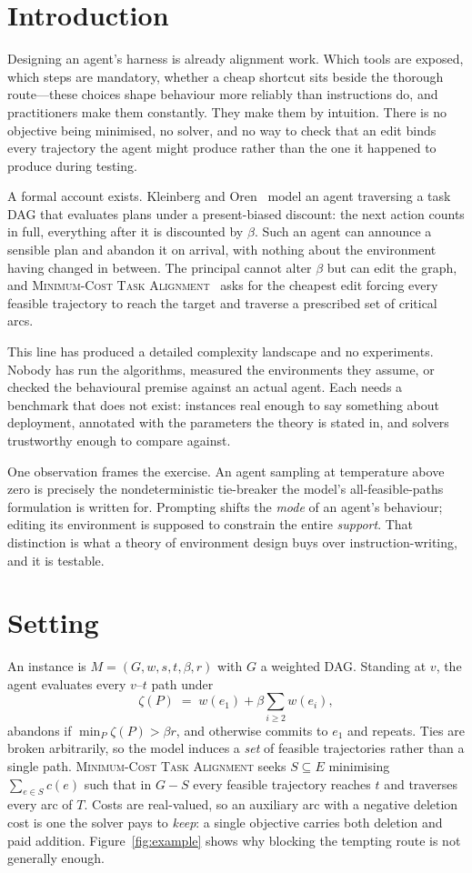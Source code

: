 \documentclass[10pt]{article}
\newcommand{\MCTA}{\textsc{Minimum-Cost Task Alignment}}
\begin{document}
\section{Introduction}

Designing an agent's harness is already alignment work. Which tools are exposed,
which steps are mandatory, whether a cheap shortcut sits beside the thorough
route---these choices shape behaviour more reliably than instructions do, and
practitioners make them constantly. They make them by intuition. There is no
objective being minimised, no solver, and no way to check that an edit binds every
trajectory the agent might produce rather than the one it happened to produce
during testing.

A formal account exists. Kleinberg and Oren~\cite{kleinberg2014} model an agent
traversing a task DAG that evaluates plans under a present-biased discount: the
next action counts in full, everything after it is discounted by $\beta$. Such an
agent can announce a sensible plan and abandon it on arrival, with nothing about
the environment having changed in between. The principal cannot alter $\beta$ but
can edit the graph, and \MCTA{}~\cite{belova2024,belova2026} asks for the cheapest
edit forcing every feasible trajectory to reach the target and traverse a
prescribed set of critical arcs.

This line has produced a detailed complexity landscape and no experiments. Nobody
has run the algorithms, measured the environments they assume, or checked the
behavioural premise against an actual agent. Each needs a benchmark that does not
exist: instances real enough to say something about deployment, annotated with the
parameters the theory is stated in, and solvers trustworthy enough to compare
against.

One observation frames the exercise. An agent sampling at temperature above zero is
precisely the nondeterministic tie-breaker the model's all-feasible-paths
formulation is written for. Prompting shifts the \emph{mode} of an agent's
behaviour; editing its environment is supposed to constrain the entire
\emph{support}. That distinction is what a theory of environment design buys over
instruction-writing, and it is testable.

\section{Setting}

An instance is $M = (G, w, s, t, \beta, r)$ with $G$ a weighted DAG. Standing at
$v$, the agent evaluates every $v$--$t$ path under
\[
  \zeta(P) \;=\; w(e_1) + \beta \sum_{i \geq 2} w(e_i),
\]
abandons if $\min_P \zeta(P) > \beta r$, and otherwise commits to $e_1$ and
repeats. Ties are broken arbitrarily, so the model induces a \emph{set} of feasible
trajectories rather than a single path. \MCTA{} seeks $S \subseteq E$ minimising
$\sum_{e \in S} c(e)$ such that in $G - S$ every feasible trajectory reaches $t$ and
traverses every arc of $T$. Costs are real-valued, so an auxiliary arc with a
negative deletion cost is one the solver pays to \emph{keep}: a single objective
carries both deletion and paid addition. Figure~\ref{fig:example} shows why blocking
the tempting route is not generally enough.
\end{document}
